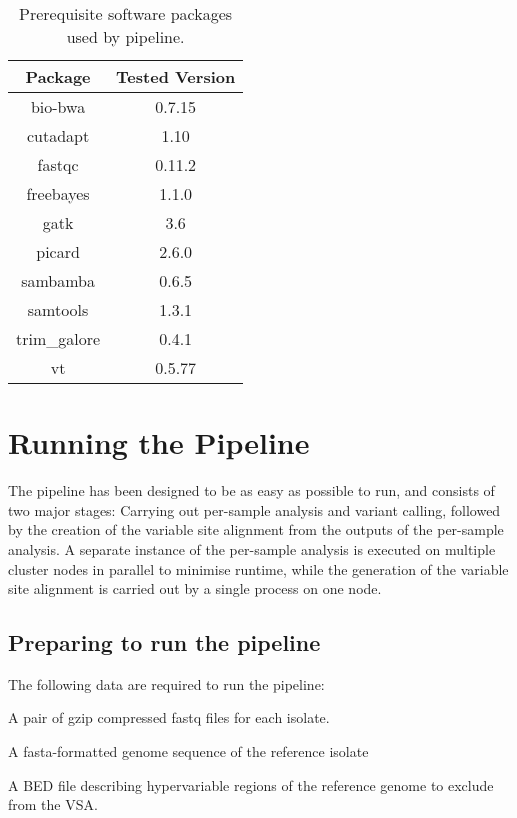 \documentclass[a4paper,10pt,twoside]{article}
\newenvironment{tight_enumerate}{
\begin{enumerate}
  \setlength{\itemsep}{0pt}
  \setlength{\parskip}{0pt}
}{\end{enumerate}}
\begin{document}
\begin{table}
{\scriptsize
\begin{tabularx}{100pt}{@{}cc@{}}\toprule
Package	& Tested Version \\\midrule
bio-bwa		&	0.7.15 \\
cutadapt	&	1.10 \\
fastqc		&	0.11.2 \\
freebayes	&	1.1.0 \\
gatk		&	3.6 \\
picard		&	2.6.0 \\
sambamba	&	0.6.5 \\
samtools	&	1.3.1 \\
trim\_galore	&	0.4.1 \\
vt	&	0.5.77 \\\hline
\end{tabularx}}{}
\caption{Prerequisite software packages used by pipeline.\label{tab:01}} 
\end{table}

\section {Running the Pipeline}

The pipeline has been designed to be as easy as possible to run, and consists
of two major stages: Carrying out per-sample analysis and variant calling,
followed by the creation of the variable site alignment from the outputs of the
per-sample analysis. A separate instance of the per-sample analysis is executed
on multiple cluster nodes in parallel to minimise runtime, while the generation
of the variable site alignment is carried out by a single process on one node.

\subsection {Preparing to run the pipeline}

The following data are required to run the pipeline:

\begin{tight_enumerate}
\item A pair of gzip compressed fastq files for each isolate. 
\item A fasta-formatted genome sequence of the reference isolate
\item A BED file describing hypervariable regions of the reference genome to exclude from the VSA.
\end{tight_enumerate}
\end{document}
